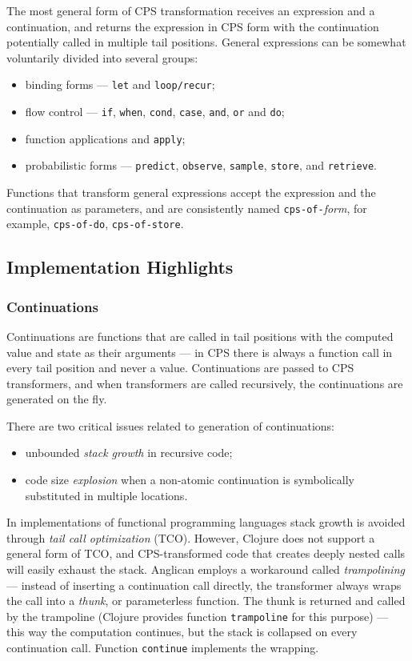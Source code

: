 \documentclass[preprint]{sigplanconf}
\begin{document}
The most general form of CPS transformation receives an
expression and a continuation, and returns the expression
in CPS form with the continuation potentially called in multiple
tail positions. General expressions can be somewhat voluntarily
divided into several groups:
\begin{itemize}
    \item binding forms --- \texttt{let} and
        \texttt{loop/recur};
    \item flow control --- \texttt{if}, \texttt{when},
        \texttt{cond}, \texttt{case}, \texttt{and}, \texttt{or} and \texttt{do};
    \item function applications and \texttt{apply};
    \item probabilistic forms --- \texttt{predict},
        \texttt{observe}, \texttt{sample}, \texttt{store}, and \texttt{retrieve}.
\end{itemize}
Functions that transform general expressions accept the
expression and the continuation as parameters, and are
consistently named \texttt{cps-of-}\textit{form}, for example,
\texttt{cps-of-do}, \texttt{cps-of-store}.

\subsection{Implementation Highlights}

\subsubsection{Continuations}

Continuations are functions that are called in tail positions
with the computed value and state as their arguments --- in CPS
there is always a function call in every tail position and never
a value. Continuations are passed to CPS transformers, and when
transformers are called recursively, the continuations are
generated on the fly. 

There are two critical issues related to generation of
continuations:
\begin{itemize}
    \item unbounded \textit{stack growth} in recursive code;
    \item code size \textit{explosion} when a non-atomic
        continuation is symbolically substituted in multiple
        locations.
\end{itemize}
        
In implementations of functional programming languages stack
growth is avoided through \textit{tail call optimization} (TCO).
However, Clojure does not support a general form of TCO, and
CPS-transformed code that creates deeply nested calls will
easily exhaust the stack. Anglican employs a workaround called
\textit{trampolining} --- instead of inserting a continuation
call directly, the transformer always wraps the call into a
\textit{thunk}, or parameterless function. The thunk is returned
and called by the trampoline (Clojure provides function
\texttt{trampoline} for this purpose) --- this way the
computation continues, but the stack is collapsed on every
continuation call. Function \texttt{continue} implements the
wrapping.
\end{document}
